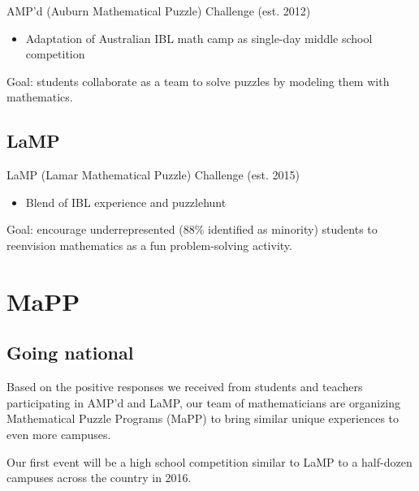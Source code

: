 \documentclass{beamer}
\theoremstyle{theorem}
\theoremstyle{definition}
\newcommand{\<}{\langle}
\renewcommand{\>}{\rangle}
\newcommand{\vpause}{\pause\vspace{1em}}
\begin{document}
\begin{frame}
  AMP'd (Auburn Mathematical Puzzle) Challenge (est. 2012)
  \begin{itemize}
    \item Adaptation of Australian IBL math camp
          as single-day middle school competition
  \end{itemize}

  \vpause

  Goal: students collaborate as a team to solve puzzles by modeling them
  with mathematics.
\end{frame}

\subsection{LaMP}

\begin{frame}
  LaMP (Lamar Mathematical Puzzle) Challenge (est. 2015)
  \begin{itemize}
    \item Blend of IBL experience and puzzlehunt
  \end{itemize}

  Goal: encourage underrepresented (88\% identified as minority)
  students to reenvision mathematics as a fun problem-solving
  activity.
\end{frame}

\section{MaPP}

\subsection{Going national}

\begin{frame}
  Based on the positive responses we received from students and
  teachers participating in AMP'd and LaMP, our team of mathematicians
  are organizing Mathematical Puzzle Programs (MaPP) to bring similar
  unique experiences to even more campuses.

  \vpause

  Our first event will be a high school competition similar to LaMP
  to a half-dozen campuses across the country in 2016.
\end{frame}
\end{document}
